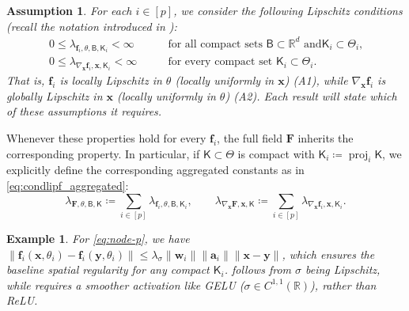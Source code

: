 \documentclass[twoside,11pt]{article}
\theoremstyle{plain}
\newtheorem{assumption}{Assumption}
\newtheorem{remark}[theorem]{Remark}
\newtheorem{example}{Example}
\def\R{\mathbb R}
\newcommand{\bff}{\mathbf{f}}
\newcommand{\bfF}{\mathbf{F}}
\newcommand{\bfx}{\mathbf{x}}
\newcommand{\bfy}{\mathbf{y}}
\begin{document}
\begin{assumption}\label{ass:menu}
For each $i\in[p]$, we consider the following Lipschitz conditions (recall the notation introduced in ):
\begin{align}
0\le\lambda_{\bff_i,\theta,\mathsf B,\mathsf K_i}<\infty
&\qquad
\text{for all compact sets $\mathsf B\subset\R^d$ and
$\mathsf K_i\subset\Theta_i$,}
\tag{A1}\label{ass:lipthetaF}\\
0\le\lambda_{\nabla_\bfx\bff_i,\bfx,\mathsf K_i}<\infty
&\qquad
\text{for every compact set $\mathsf K_i\subset\Theta_i$.}
\tag{A2}\label{ass:lipxdxF}
\end{align}
That is, $\bff_i$ is locally Lipschitz in $\theta$ (locally uniformly in $\bfx$) \emph{(A1)}, while $\nabla_\bfx\bff_i$ is globally Lipschitz in $\bfx$ (locally uniformly in $\theta$) \emph{(A2)}. Each result will state which of these assumptions it requires.
\end{assumption}

Whenever these properties hold for every $\bff_i$,
the full field $\bfF$ inherits the corresponding property. In particular,
if $\mathsf K\subset\Theta$ is compact with
$\mathsf K_i\coloneqq\operatorname{proj}_i\mathsf K$, we explicitly define the
corresponding aggregated constants as in \eqref{eq:condlipf_aggregated}:
\[
\lambda_{\bfF,\theta,\mathsf B,\mathsf K} \coloneqq \sum_{i\in[p]}\lambda_{\bff_i,\theta,\mathsf B,\mathsf K_i},
\qquad
\lambda_{\nabla_\bfx\bfF,\bfx,\mathsf K} \coloneqq \sum_{i\in[p]}\lambda_{\nabla_\bfx\bff_i,\bfx,\mathsf K_i}.
\]


\begin{example}
For \eqref{eq:node-p}, we have $\|\bff_i(\bfx,\theta_i)-\bff_i(\bfy,\theta_i)\| \leq \lambda_\sigma \|\mathbf{w}_i\|\|\mathbf{a}_i\|\|\bfx-\bfy\|$, which ensures the baseline spatial regularity for any compact $\mathsf K_i$.  follows from $\sigma$ being Lipschitz, while  requires a smoother activation like GELU ($\sigma\in{C}^{1,1}(\R)$), rather than ReLU.
\end{example}


\end{document}
